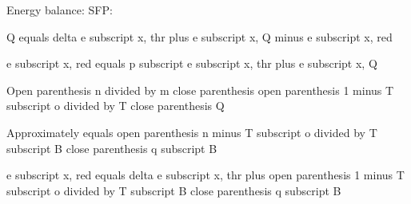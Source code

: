 Energy balance: SFP:

Q equals delta e subscript x, thr plus e subscript x, Q minus e subscript x, red

e subscript x, red equals p subscript e subscript x, thr plus e subscript x, Q

Open parenthesis n divided by m close parenthesis open parenthesis 1 minus T subscript o divided by T close parenthesis Q

Approximately equals open parenthesis n minus T subscript o divided by T subscript B close parenthesis q subscript B

e subscript x, red equals delta e subscript x, thr plus open parenthesis 1 minus T subscript o divided by T subscript B close parenthesis q subscript B